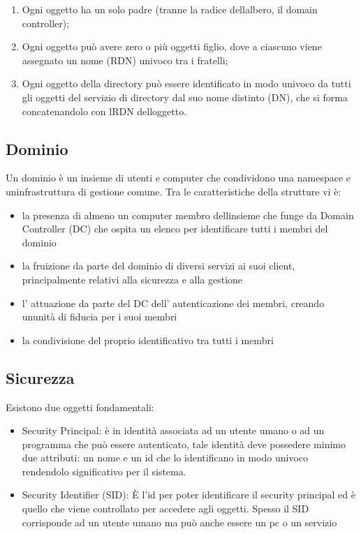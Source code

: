 \begin{enumerate}
\def\labelenumi{\arabic{enumi}.}
\item
  Ogni oggetto ha un solo padre (tranne la radice
  dell\textquotesingle albero, il domain controller);
\item
  Ogni oggetto può avere zero o più oggetti figlio, dove a ciascuno
  viene assegnato un nome (RDN) univoco tra i fratelli;
\item
  Ogni oggetto della directory può essere identificato in modo univoco
  da tutti gli oggetti del servizio di directory dal suo nome distinto
  (DN), che si forma concatenandolo con l\textquotesingle RDN
  dell\textquotesingle oggetto.
\end{enumerate}

\subsection{Dominio}\label{dominio}

Un dominio è un insieme di utenti e computer che condividono una
namespace e un\textquotesingle infrastruttura di gestione comune. Tra le
caratteristiche della strutture vi è:

\begin{itemize}
\item
  la presenza di almeno un computer membro dell\textquotesingle insieme
  che funge da Domain Controller (DC) che ospita un elenco per
  identificare tutti i membri del dominio
\item
  la fruizione da parte del dominio di diversi servizi ai suoi client,
  principalmente relativi alla sicurezza e alla gestione
\item
  l' attuazione da parte del DC dell' autenticazione dei membri, creando
  un\textquotesingle unità di fiducia per i suoi membri
\item
  la condivisione del proprio identificativo tra tutti i membri
\end{itemize}

\subsection{Sicurezza}\label{sicurezza}

Esistono due oggetti fondamentali:

\begin{itemize}
\item
  Security Principal: è in identità associata ad un utente umano o ad un
  programma che può essere autenticato, tale identità deve possedere
  minimo due attributi: un nome e un id che lo identificano in modo
  univoco rendendolo significativo per il sistema.
\item
  Security Identifier (SID): È l'id per poter identificare il security
  principal ed è quello che viene controllato per accedere agli oggetti.
  Spesso il SID corrisponde ad un utente umano ma può anche essere un pc
  o un servizio
\end{itemize}

